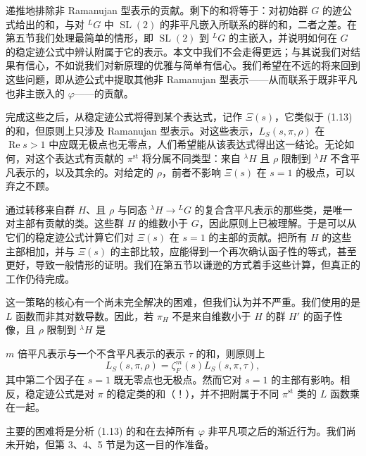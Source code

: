 递推地排除非 Ramanujan 型表示的贡献。剩下的和将等于：对初始群 $G$ 的迹公式给出的和，与对 ${}^LG$ 中 $\operatorname{SL}(2)$ 的非平凡嵌入所联系的群的和，二者之差。在第五节我们处理最简单的情形，即 $\operatorname{SL}(2)$ 到 ${}^LG$ 的主嵌入，并说明如何在 $G$ 的稳定迹公式中辨认附属于它的表示。本文中我们不会走得更远；与其说我们对结果有信心，不如说我们对新原理的优雅与简单有信心。我们希望在不远的将来回到这些问题，即从迹公式中提取其他非 Ramanujan 型表示——从而联系于既非平凡也非主嵌入的 $\varphi$——的贡献。

完成这些之后，从稳定迹公式将得到某个表达式，记作 $\Xi(s)$，它类似于 (1.13) 的和，但原则上只涉及 Ramanujan 型表示。对这些表示，$L_S(s,\pi,\rho)$ 在 $\operatorname{Re}s>1$ 中应既无极点也无零点，人们希望能从该表达式得出这一结论。无论如何，对这个表达式有贡献的 $\pi^{\mathrm{st}}$ 将分属不同类型：来自 ${}^{\lambda}H$ 且 $\rho$ 限制到 ${}^{\lambda}H$ 不含平凡表示的，以及其余的。对给定的 $\rho$，前者不影响 $\Xi(s)$ 在 $s=1$ 的极点，可以弃之不顾。

通过转移来自群 $H$、且 $\rho$ 与同态 ${}^{\lambda}H\to{}^LG$ 的复合含平凡表示的那些类，是唯一对主部有贡献的类。这些群 $H$ 的维数小于 $G$，因此原则上已被理解。于是可以从它们的稳定迹公式计算它们对 $\Xi(s)$ 在 $s=1$ 的主部的贡献。把所有 $H$ 的这些主部相加，并与 $\Xi(s)$ 的主部比较，应能得到一个再次确认函子性的等式，甚至更好，导致一般情形的证明。我们在第五节以谦逊的方式着手这些计算，但真正的工作仍待完成。

这一策略的核心有一个尚未完全解决的困难，但我们认为并不严重。我们使用的是 $L$ 函数而非其对数导数。因此，若 $\pi_H$ 不是来自维数小于 $H$ 的群 $H'$ 的函子性像，且 $\rho$ 限制到 ${}^{\lambda}H$ 是

$m$ 倍平凡表示与一个不含平凡表示的表示 $\tau$ 的和，则原则上
\[
L_S(s,\pi,\rho)=\zeta_F^m(s)L_S(s,\pi,\tau),
\]
其中第二个因子在 $s=1$ 既无零点也无极点。然而它对 $s=1$ 的主部有影响。相反，稳定迹公式是对 $\pi$ 的稳定类的和（！），并不把附属于不同 $\pi^{\mathrm{st}}$ 类的 $L$ 函数乘在一起。

主要的困难将是分析 (1.13) 的和在去掉所有 $\varphi$ 非平凡项之后的渐近行为。我们尚未开始，但第 3、4、5 节是为这一目的作准备。
